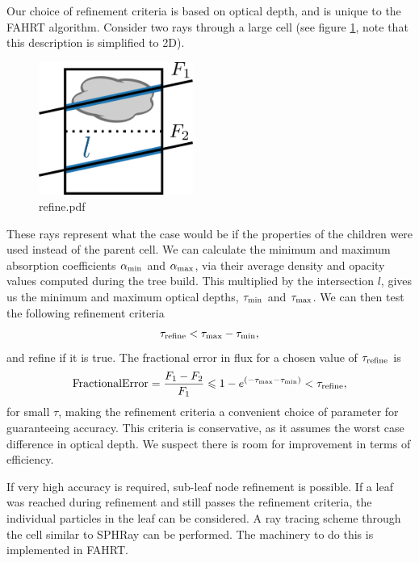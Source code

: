 \documentclass[fleqn,usenatbib]{mnras}
\newcommand{\acro}{FAHRT}
\begin{document}
Our choice of refinement criteria is based on optical depth, and is unique to 
the \acro{} algorithm. Consider two rays through a large cell (see figure 
\ref{fig:refine}, note that this description is simplified to 2D).
\begin{figure}
\includegraphics[width=0.45\textwidth]{Figures/refine.png}
\caption{refine.pdf}
\label{fig:refine}
\end{figure}
These rays represent what the case would be if the properties of the children 
were used instead of the parent cell. We can calculate the minimum and maximum 
absorption coefficients $\alpha_{\rm min}$ and $\alpha_{\rm max}$, via their 
average density and opacity values computed during the tree build. This 
multiplied by the intersection $l$, gives us the minimum and maximum optical 
depths, $\tau_{\rm min}$ and $\tau_{\rm max}$. We can then test the following 
refinement criteria
\begin{equation}
\tau_{\rm refine} < \tau_{\rm max} - \tau_{\rm min},
\end{equation}
and refine if it is true. The fractional error in flux for a chosen value of 
$\tau_{\rm refine}$ is 
\begin{equation}
{\rm Fractional Error} = \frac{F_1-F_2}{F_1} \leq 1 - e^{(-\tau_{\rm max} - 
\tau_{\rm min})} < \tau_{\rm refine},
\end{equation}
for small $\tau$, making the refinement criteria a convenient choice of 
parameter for guaranteeing accuracy.  This criteria is conservative, as it 
assumes the worst case difference in optical depth. We suspect there is room 
for improvement in terms of efficiency.

If very high accuracy is required, sub-leaf node refinement is possible. If a 
leaf was reached during refinement and still passes the refinement criteria, 
the individual particles in the leaf can be considered. A ray tracing scheme 
through the cell similar to SPHRay \citep{altayEt08} can be performed. 
The machinery to do this is implemented in \acro{}.
\end{document}
